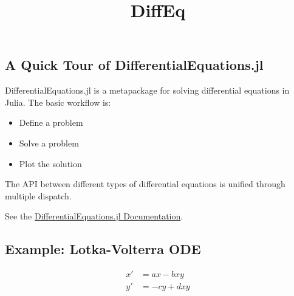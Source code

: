 \documentclass[11pt]{article}
\title{DiffEq}
\providecommand{\tightlist}{%
      \setlength{\itemsep}{0pt}\setlength{\parskip}{0pt}}
\begin{document}
    
    
    \maketitle
    
    

    
    \subsection{A Quick Tour of
DifferentialEquations.jl}\label{a-quick-tour-of-differentialequations.jl}

DifferentialEquations.jl is a metapackage for solving differential
equations in Julia. The basic workflow is:

\begin{itemize}
\tightlist
\item
  Define a problem
\item
  Solve a problem
\item
  Plot the solution
\end{itemize}

The API between different types of differential equations is unified
through multiple dispatch.

See the
\href{http://docs.juliadiffeq.org/latest/index.html}{DifferentialEquations.jl
Documentation}.

    \subsection{Example: Lotka-Volterra
ODE}\label{example-lotka-volterra-ode}

\[\begin{align}
x' &= ax - bxy\\
y' &= -cy + dxy
\end{align}\]
\end{document}
